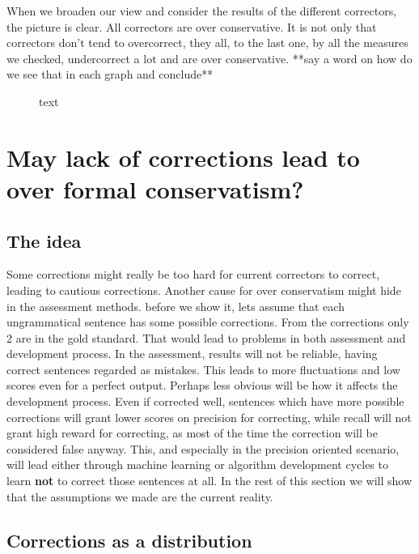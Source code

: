 \documentclass[english]{article}
\begin{document}
When we broaden our view and consider the results of the different
correctors, the picture is clear. All correctors are over conservative.
It is not only that correctors don't tend to overcorrect, they all,
to the last one, by all the measures we checked, undercorrect a lot
and are over conservative. {*}{*}say a word on how do we see that
in each graph and conclude{*}{*}

\begin{figure}
text
\end{figure}


\section{May lack of corrections lead to over formal conservatism?\label{sec:May-lack-of}}

\subsection{The idea}

Some corrections might really be too hard for current correctors to
correct, leading to cautious corrections. Another cause for over conservatism
might hide in the assessment methods. before we show it, lets assume
that each ungrammatical sentence has some possible corrections. From
the corrections only 2 are in the gold standard. That would lead to
problems in both assessment and development process. In the assessment,
results will not be reliable, having correct sentences regarded as mistakes. This leads to more fluctuations and low scores even for a perfect output.
Perhaps less obvious will be how it affects the development
process. Even if corrected well, sentences which have more possible
corrections will grant lower scores on precision for correcting, while recall will not grant high reward for correcting, as most of the time the correction will be considered false anyway. This, and especially in the precision oriented scenario, will lead either through
machine learning or algorithm development cycles to learn \textbf{not} to correct
those sentences at all. In the rest of this section we will show that
the assumptions we made are the current reality.

\subsection{Corrections as a distribution}
\end{document}
